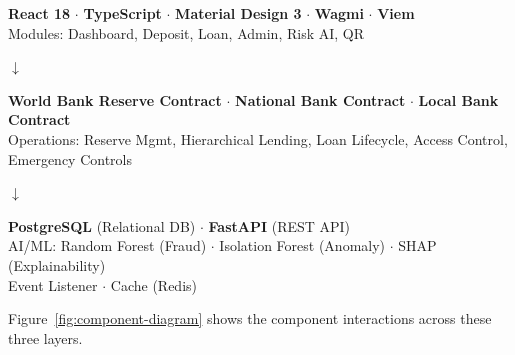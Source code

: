 \documentclass[12pt,a4paper]{report}
\begin{document}
\vspace{6pt}
\begin{minipage}{\textwidth}
\begin{center}
\begin{tcolorbox}[colback=white,colframe=black,coltitle=white,fonttitle=\bfseries\small,title={PRESENTATION LAYER},boxrule=0.8pt,arc=3pt,left=6pt,right=6pt,top=4pt,bottom=4pt]
\textbf{React 18} \(\cdot\) \textbf{TypeScript} \(\cdot\) \textbf{Material Design 3} \(\cdot\) \textbf{Wagmi} \(\cdot\) \textbf{Viem}\\[4pt]
{\small Modules: Dashboard, Deposit, Loan, Admin, Risk AI, QR}
\end{tcolorbox}

\vspace{2pt}
{\Large $\boldsymbol{\downarrow}$}
\vspace{2pt}

\begin{tcolorbox}[colback=white,colframe=black,coltitle=white,fonttitle=\bfseries\small,title={SMART CONTRACT LAYER \normalfont\small(EVM: Ethereum / Polygon)},boxrule=0.8pt,arc=3pt,left=6pt,right=6pt,top=4pt,bottom=4pt]
\textbf{World Bank Reserve Contract} \(\cdot\) \textbf{National Bank Contract} \(\cdot\) \textbf{Local Bank Contract}\\[4pt]
{\small Operations: Reserve Mgmt, Hierarchical Lending, Loan Lifecycle, Access Control, Emergency Controls}
\end{tcolorbox}

\vspace{2pt}
{\Large $\boldsymbol{\downarrow}$}
\vspace{2pt}

\begin{tcolorbox}[colback=white,colframe=black,coltitle=white,fonttitle=\bfseries\small,title={OFF-CHAIN SERVICES LAYER},boxrule=0.8pt,arc=3pt,left=6pt,right=6pt,top=4pt,bottom=4pt]
\textbf{PostgreSQL} (Relational DB) \(\cdot\) \textbf{FastAPI} (REST API)\\[4pt]
{\small AI/ML: Random Forest (Fraud) \(\cdot\) Isolation Forest (Anomaly) \(\cdot\) SHAP (Explainability)}\\[2pt]
{\small Event Listener \(\cdot\) Cache (Redis)}
\end{tcolorbox}
\end{center}
\end{minipage}
\vspace{6pt}

Figure~\ref{fig:component-diagram} shows the component interactions across these three layers.
\end{document}
